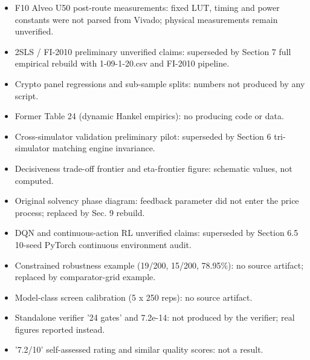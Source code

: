 \begin{itemize}\setlength\itemsep{0pt}
\item F10 Alveo U50 post-route measurements: fixed LUT, timing and power constants were not parsed from Vivado; physical measurements remain unverified.
\item 2SLS / FI-2010 preliminary unverified claims: superseded by Section 7 full empirical rebuild with 1-09-1-20.csv and FI-2010 pipeline.
\item Crypto panel regressions and sub-sample splits: numbers not produced by any script.
\item Former Table 24 (dynamic Hankel empirics): no producing code or data.
\item Cross-simulator validation preliminary pilot: superseded by Section 6 tri-simulator matching engine invariance.
\item Decisiveness trade-off frontier and eta-frontier figure: schematic values, not computed.
\item Original solvency phase diagram: feedback parameter did not enter the price process; replaced by Sec. 9 rebuild.
\item DQN and continuous-action RL unverified claims: superseded by Section 6.5 10-seed PyTorch continuous environment audit.
\item Constrained robustness example (19/200, 15/200, 78.95\%): no source artifact; replaced by comparator-grid example.
\item Model-class screen calibration (5 x 250 reps): no source artifact.
\item Standalone verifier '24 gates' and 7.2e-14: not produced by the verifier; real figures reported instead.
\item '7.2/10' self-assessed rating and similar quality scores: not a result.
\end{itemize}
